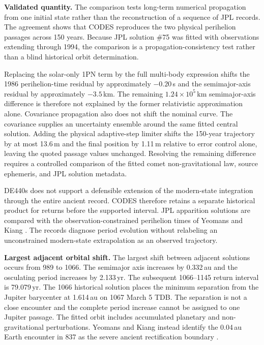 \begin{resultbox}
\textbf{\color{cGold}Validated quantity.}
The comparison tests long-term numerical propagation from one initial state
rather than the reconstruction of a sequence of JPL records. The agreement
shows that CODES reproduces the two physical perihelion passages across
150 years.
Because JPL solution \#75 was fitted with observations extending through
1994, the comparison is a propagation-consistency test rather than a blind
historical orbit determination.
\end{resultbox}

Replacing the solar-only 1PN term by the full multi-body expression shifts
the 1986 perihelion-time residual by approximately $-0.20$\,s and the
semimajor-axis residual by approximately $-3.5$\,km. The remaining
$1.24\times10^5$\,km semimajor-axis difference is therefore not explained by
the former relativistic approximation alone. Covariance propagation also does
not shift the nominal curve. The covariance supplies an
uncertainty ensemble around the same fitted central solution. Adding the
physical adaptive-step limiter
shifts the 150-year trajectory by at most 13.6\,m and the final position by
1.11\,m relative to error control alone, leaving the quoted passage values
unchanged. Resolving the remaining difference requires a controlled comparison
of the fitted comet non-gravitational law, source ephemeris, and JPL solution
metadata.

DE440s does not support a defensible extension of the modern-state integration
through the entire ancient record. CODES therefore retains a separate
historical product for returns before the supported interval. JPL apparition
solutions are compared with the observation-constrained perihelion times of Yeomans and
Kiang \cite{Horizons,YeomansKiang1981}. The records diagnose period evolution
without relabeling an unconstrained modern-state extrapolation as an observed
trajectory.



\begin{resultbox}
\textbf{\color{cGold}Largest adjacent orbital shift.}
The largest shift between adjacent solutions occurs from 989 to 1066. The
semimajor axis increases by 0.332\,au and the osculating period
increases by 2.133\,yr. The subsequent 1066--1145 return interval is
79.079\,yr. The 1066 historical solution places the minimum separation from
the Jupiter barycenter at 1.614\,au on 1067 March 5 TDB. The separation is not
a close encounter and the complete period increase cannot be assigned to one
Jupiter passage. The fitted orbit includes accumulated planetary and
non-gravitational perturbations. Yeomans and Kiang instead identify the
0.04\,au Earth encounter in 837 as the severe ancient rectification boundary
\cite{YeomansKiang1981}.
\end{resultbox}

